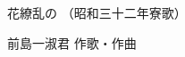 \documentclass[10pt,b5j]{tarticle} %
\begin{document}
\begin{minipage}[c]{0.7\hsize} %
    \begin{center}
        {\LARGE
            花繚乱の %
        }
        {\small 
            （昭和三十二年寮歌） %
        }
    \end{center}
\end{minipage}
\begin{minipage}[c]{0.3\hsize} %
    \begin{flushright} %
        前島一淑君 作歌・作曲 %
    \end{flushright}
\end{minipage}
\end{document}
